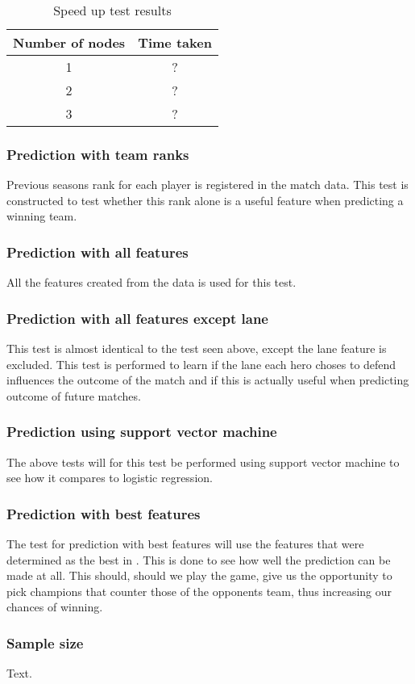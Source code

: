 \begin{table}[!htb]
  \centering
  \begin{tabular}{|c|c|}
    \hline
    Number of nodes & Time taken\\
    \hline
    1 & ? \\
    2 & ? \\
    3 & ? \\
    \hline
  \end{tabular}
  \caption{Speed up test results}\label{tab:speedup}
\end{table}

\subsubsection{Prediction with team ranks}
Previous seasons rank for each player is registered in the match data. This test is constructed to test whether this rank alone is a useful feature when predicting a winning team.
\subsubsection{Prediction with all features}
All the features created from the data is used for this test. 
\subsubsection{Prediction with all features except lane}
This test is almost identical to the test seen above, except the lane feature is excluded. This test is performed to learn if the lane each hero choses to defend influences the outcome of the match and if this is actually useful when predicting outcome of future matches.
\subsubsection{Prediction using support vector machine}
The above tests will for this test be performed using support vector machine to see how it compares to logistic regression. 
\subsubsection{Prediction with best features}
The test for prediction with best features will use the features that were determined as the best in . This is done to see how well the prediction can be made at all. This should, should we play the game, give us the opportunity to pick champions that counter those of the opponents team, thus increasing our chances of winning.
\subsubsection{Sample size}
Text.


